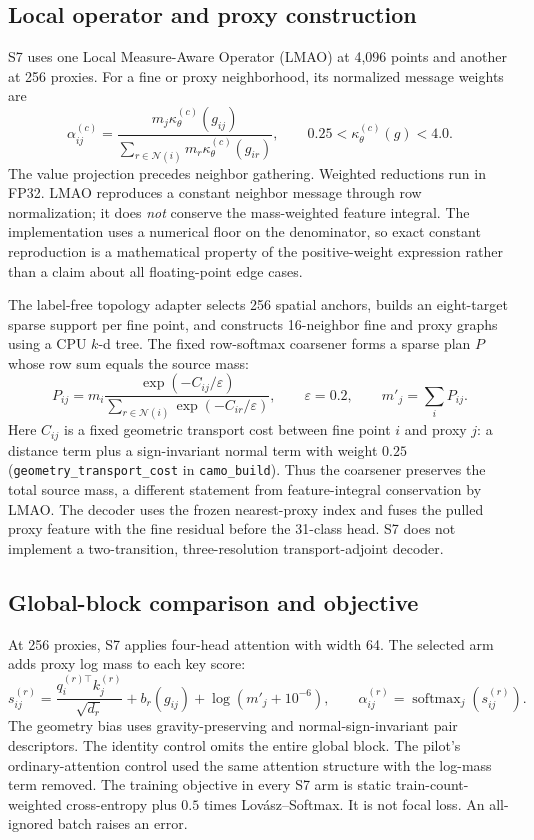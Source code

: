 \documentclass[11pt,a4paper]{article}
\begin{document}
\subsection{Local operator and proxy construction}

S7 uses one Local Measure-Aware Operator (LMAO) at 4,096 points and another at 256 proxies. For a fine or proxy neighborhood, its normalized message weights are
\begin{equation}
 \alpha_{ij}^{(c)}=
 \frac{m_j\kappa_\theta^{(c)}(g_{ij})}
 {\sum_{r\in\mathcal N(i)}m_r\kappa_\theta^{(c)}(g_{ir})},
 \qquad 0.25<\kappa_\theta^{(c)}(g)<4.0 .
\end{equation}
The value projection precedes neighbor gathering. Weighted reductions run in FP32. LMAO reproduces a constant neighbor message through row normalization; it does \emph{not} conserve the mass-weighted feature integral. The implementation uses a numerical floor on the denominator, so exact constant reproduction is a mathematical property of the positive-weight expression rather than a claim about all floating-point edge cases.

The label-free topology adapter selects 256 spatial anchors, builds an eight-target sparse support per fine point, and constructs 16-neighbor fine and proxy graphs using a CPU $k$-d tree. The fixed row-softmax coarsener forms a sparse plan $P$ whose row sum equals the source mass:
\begin{equation}
 P_{ij}=m_i\frac{\exp(-C_{ij}/\varepsilon)}
 {\sum_{r\in\mathcal N(i)}\exp(-C_{ir}/\varepsilon)},
 \qquad \varepsilon=0.2,
 \qquad m'_j=\sum_i P_{ij}.
\end{equation}
Here $C_{ij}$ is a fixed geometric transport cost between fine point $i$ and proxy $j$: a distance term plus a sign-invariant normal term with weight $0.25$ (\texttt{geometry\_transport\_cost} in \texttt{camo\_build}).
Thus the coarsener preserves the total source mass, a different statement from feature-integral conservation by LMAO. The decoder uses the frozen nearest-proxy index and fuses the pulled proxy feature with the fine residual before the 31-class head. S7 does not implement a two-transition, three-resolution transport-adjoint decoder.

\subsection{Global-block comparison and objective}

At 256 proxies, S7 applies four-head attention with width 64. The selected arm adds proxy log mass to each key score:
\begin{equation}
 s_{ij}^{(r)}=
 \frac{q_i^{(r)\top}k_j^{(r)}}{\sqrt{d_r}}
 +b_r(g_{ij})+\log(m'_j+10^{-6}),
 \qquad
 \alpha_{ij}^{(r)}=\operatorname{softmax}_j(s_{ij}^{(r)}).
\end{equation}
The geometry bias uses gravity-preserving and normal-sign-invariant pair descriptors. The identity control omits the entire global block. The pilot's ordinary-attention control used the same attention structure with the log-mass term removed. The training objective in every S7 arm is static train-count-weighted cross-entropy plus $0.5$ times Lov\'asz--Softmax. It is not focal loss. An all-ignored batch raises an error.
\end{document}

